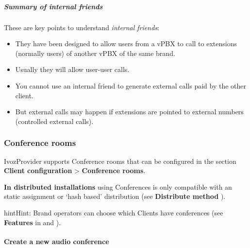 \documentclass[letterpaper,10pt,english]{sphinxmanual}
\begin{document}
\subparagraph{Summary of internal friends}
\label{administration_portal/client/vpbx/routing_endpoints/friends/internal_friends:summary-of-internal-friends}
These are key points to understand \emph{internal friends}:
\begin{itemize}
\item {} 
They have been designed to allow users from a vPBX to call to extensions (normally users)
of another vPBX of the same brand.

\item {} 
Usually they will allow user-user calls.

\item {} 
You cannot use an internal friend to generate external calls paid by the other client.

\item {} 
But external calls may happen if extensions are pointed to external numbers (controlled external calls).

\end{itemize}


\subsubsection{Conference rooms}
\label{administration_portal/client/vpbx/routing_endpoints/conference_rooms::doc}\label{administration_portal/client/vpbx/routing_endpoints/conference_rooms:conference-rooms}\label{administration_portal/client/vpbx/routing_endpoints/conference_rooms:id1}
IvozProvider supports Conference rooms that can be configured in the section
\textbf{Client configuration} \textgreater{} \textbf{Conference rooms}.

\textbf{In distributed installations} using Conferences is only compatible with an static
assignment or `hash based' distribution (see \textbf{Distribute method} {\hyperref[administration_portal/brand/clients/virtual_pbx:virtual\string-pbx]{}}).

\begin{notice}{hint}{Hint:}
Brand operators can choose which Clients have conferences (see \textbf{Features}
in {\hyperref[getting_started/internal_calls/brand_portal:brand\string-configuration]{}} and {\hyperref[getting_started/internal_calls/client_portal:client\string-configuration]{}}).
\end{notice}
\paragraph{Create a new audio conference}
\end{document}
